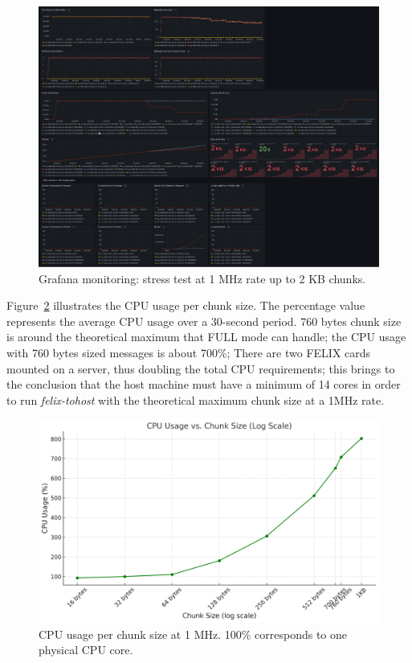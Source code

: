 \begin{figure}[htbp]
\centering
\includegraphics[width=\textwidth]{images/results/tohost-perf.png}
\caption{Grafana monitoring: stress test at 1 MHz rate up to 2 KB chunks.}
\label{fig:tohost-perf}
\end{figure}

Figure~\ref{fig:cpu-usage} illustrates the CPU usage per chunk size. The percentage value represents the average CPU usage over a 30-second period. 760 bytes chunk size is around the theoretical maximum that FULL mode can handle; the CPU usage with 760 bytes sized messages is about 700\%; There are two \acs{FELIX} cards mounted on a server, thus doubling the total CPU requirements; this brings to the conclusion that the host machine must have a minimum of 14 cores in order to run \emph{felix-tohost} with the theoretical maximum chunk size at a 1MHz rate.

\begin{figure}[htbp]
\centering
\includegraphics[width=\textwidth]{images/results/cpu-usage-chunk-size-1MHz.png}
\caption[CPU usage per chunk size at 1 MHz]{CPU usage per chunk size at 1 MHz. 100\% corresponds to one physical CPU core.}
\label{fig:cpu-usage}
\end{figure}

